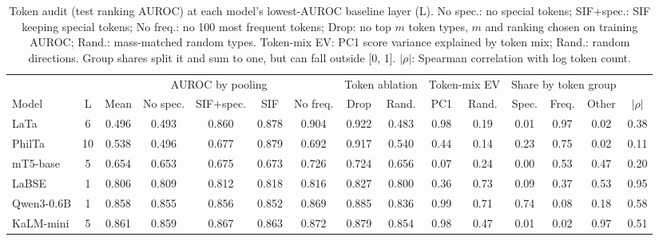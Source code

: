 \begin{table}[t]
\centering
\footnotesize
\setlength{\tabcolsep}{2.6pt}
\begin{tabular}{@{}lcccccccccccccc@{}}
\toprule
 & & \multicolumn{5}{c}{AUROC by pooling} & \multicolumn{2}{c}{Token ablation} & \multicolumn{2}{c}{Token-mix EV} & \multicolumn{3}{c}{Share by token group} & \\
\cmidrule(lr){3-7}\cmidrule(lr){8-9}\cmidrule(lr){10-11}\cmidrule(lr){12-14}
Model & L & Mean & No spec. & SIF+spec. & SIF & No freq. & Drop & Rand. & PC1 & Rand. & Spec. & Freq. & Other & $|\rho|$ \\
\midrule
LaTa & 6 & 0.496 & 0.493 & 0.860 & 0.878 & 0.904 & 0.922 & 0.483 & 0.98 & 0.19 & 0.01 & 0.97 & 0.02 & 0.38 \\
PhilTa & 10 & 0.538 & 0.496 & 0.677 & 0.879 & 0.692 & 0.917 & 0.540 & 0.44 & 0.14 & 0.23 & 0.75 & 0.02 & 0.11 \\
mT5-base & 5 & 0.654 & 0.653 & 0.675 & 0.673 & 0.726 & 0.724 & 0.656 & 0.07 & 0.24 & 0.00 & 0.53 & 0.47 & 0.20 \\
LaBSE & 1 & 0.806 & 0.809 & 0.812 & 0.818 & 0.816 & 0.827 & 0.800 & 0.36 & 0.73 & 0.09 & 0.37 & 0.53 & 0.95 \\
Qwen3-0.6B & 1 & 0.858 & 0.855 & 0.856 & 0.852 & 0.869 & 0.885 & 0.836 & 0.99 & 0.71 & 0.74 & 0.08 & 0.18 & 0.58 \\
KaLM-mini & 5 & 0.861 & 0.859 & 0.867 & 0.863 & 0.872 & 0.879 & 0.854 & 0.98 & 0.47 & 0.01 & 0.02 & 0.97 & 0.51 \\
\bottomrule
\end{tabular}
\caption{Token audit (test ranking AUROC) at each model's lowest-AUROC baseline layer (L). No spec.: no special tokens; SIF+spec.: SIF keeping special tokens; No freq.: no 100 most frequent tokens; Drop: no top $m$ token types, $m$ and ranking chosen on training AUROC; Rand.: mass-matched random types. Token-mix EV: PC1 score variance explained by token mix; Rand.: random directions. Group shares split it and sum to one, but can fall outside [0, 1]. $|\rho|$: Spearman correlation with log token count.}
\label{tab:e2_token_audit}
\end{table}
